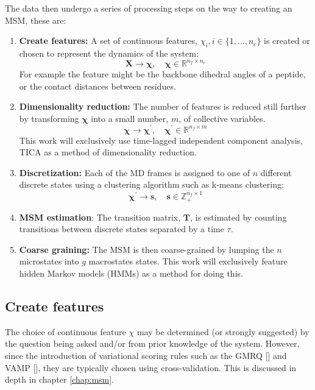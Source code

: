 The data then undergo a series of processing steps on the way to creating an MSM, these are: 

\begin{enumerate}
    \item \textbf{Create features:} A set of continuous features, $\chi_{i}, i \in \{1,\dots, n_{c} \}$ is created or chosen to represent the dynamics of the system:
    \begin{equation*}
        \mathbf{X}  \rightarrow \bm{\chi},\quad \bm{\chi} \in \mathbb{R}^{n_{f} \times n_{c}}
    \end{equation*}
    For example the feature might be the backbone dihedral angles of a peptide, or the contact distances between residues. 
    \item \textbf{Dimensionality reduction:} The number of features is reduced still further by transforming $\bm{\chi}$ into a small number, $m$, of collective variables. 
    \begin{equation*}
        \bm{\chi}  \rightarrow \bm{\chi}^{\prime},\quad \bm{\chi}^{\prime} \in \mathbb{R}^{n_{f} \times m}
    \end{equation*}
    This work will exclusively use time-lagged independent component analysis, TICA as a method of dimensionality reduction.  
    \item \textbf{Discretization:} Each of the MD frames is assigned to one of $n$ different discrete states using a clustering algorithm such as k-means clustering: 
    \begin{equation*}
        \bm{\chi}^{\prime} \rightarrow \mathbf{s},\quad \mathbf{s} \in \mathbb{Z}_{+}^{n_{f} \times 1}
    \end{equation*}
    \item \textbf{MSM estimation}: The transition matrix, $\mathbf{T}$, is estimated by counting transitions between discrete states separated by a time $\tau$. 
    \item \textbf{Coarse graining:} The MSM is then coarse-grained by lumping the $n$ microstates into $g$ macrostates states. This work will exclusively feature hidden Markov models (HMMs) as a method for doing this. 
\end{enumerate}

\subsection{Create features}
The choice of continuous feature $\chi$ may be determined (or strongly suggested) by the question being asked and/or from prior knowledge of the system. However, since the introduction of variational scoring rules such as the GMRQ [] and VAMP [], they are typically chosen using cross-validation. This is discussed in depth in chapter \ref{chap:msm}. 


